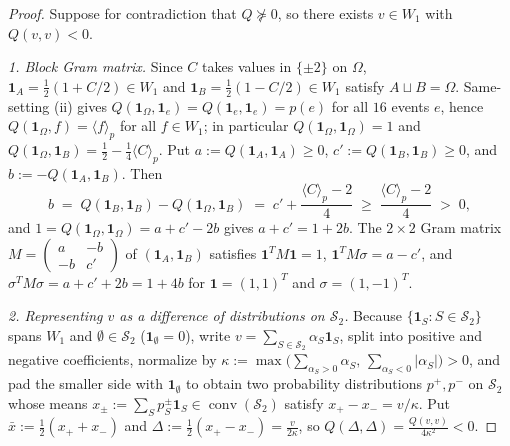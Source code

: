 \documentclass[11pt,a4paper]{article}
\theoremstyle{definition}
\theoremstyle{remark}
\newcommand{\ind}[1]{\mathbf{1}_{#1}}
\newcommand{\ev}[1]{\langle #1\rangle_p}
\DeclareMathOperator{\conv}{conv}
\begin{document}
\begin{proof}
Suppose for contradiction that $Q \not\succeq 0$, so there exists $v \in W_1$ with $Q(v, v) < 0$.

\emph{1. Block Gram matrix.} Since $C$ takes values in $\{\pm 2\}$ on $\Omega$, $\ind A = \frac{1}{2}(1 + C/2) \in W_1$ and $\ind B = \frac{1}{2}(1 - C/2) \in W_1$ satisfy $A \sqcup B = \Omega$. Same-setting (ii) gives $Q(\ind\Omega, \ind e) = Q(\ind e, \ind e) = p(e)$ for all $16$ events $e$, hence $Q(\ind\Omega, f) = \ev{f}$ for all $f \in W_1$; in particular $Q(\ind\Omega, \ind\Omega) = 1$ and $Q(\ind\Omega, \ind B) = \frac{1}{2} - \frac{1}{4}\ev{C}$. Put $a := Q(\ind A, \ind A) \ge 0$, $c' := Q(\ind B, \ind B) \ge 0$, and $b := -Q(\ind A, \ind B)$. Then
\[
  b \;=\; Q(\ind B, \ind B) - Q(\ind\Omega, \ind B) \;=\; c' + \frac{\ev{C} - 2}{4} \;\ge\; \frac{\ev{C} - 2}{4} \;>\; 0,
\]
and $1 = Q(\ind\Omega, \ind\Omega) = a + c' - 2b$ gives $a + c' = 1 + 2b$. The $2 \times 2$ Gram matrix $M = \begin{pmatrix} a & -b \\ -b & c' \end{pmatrix}$ of $(\ind A, \ind B)$ satisfies $\mathbf{1}^T M \mathbf{1} = 1$, $\mathbf{1}^T M \sigma = a - c'$, and $\sigma^T M \sigma = a + c' + 2b = 1 + 4b$ for $\mathbf{1} = (1,1)^T$ and $\sigma = (1,-1)^T$.

\emph{2. Representing $v$ as a difference of distributions on $\mathcal{S}_2$.} Because $\{\ind S : S \in \mathcal{S}_2\}$ spans $W_1$ and $\emptyset \in \mathcal{S}_2$ ($\ind\emptyset = 0$), write $v = \sum_{S \in \mathcal{S}_2} \alpha_S \ind S$, split into positive and negative coefficients, normalize by $\kappa := \max\bigl(\sum_{\alpha_S > 0} \alpha_S,\, \sum_{\alpha_S < 0} |\alpha_S|\bigr) > 0$, and pad the smaller side with $\ind\emptyset$ to obtain two probability distributions $p^+, p^-$ on $\mathcal{S}_2$ whose means $x_\pm := \sum_S p^\pm_S \ind S \in \conv(\mathcal{S}_2)$ satisfy $x_+ - x_- = v/\kappa$. Put $\bar{x} := \frac{1}{2}(x_+ + x_-)$ and $\Delta := \frac{1}{2}(x_+ - x_-) = \frac{v}{2\kappa}$, so $Q(\Delta, \Delta) = \frac{Q(v, v)}{4\kappa^2} < 0$.


\end{proof}
\end{document}
